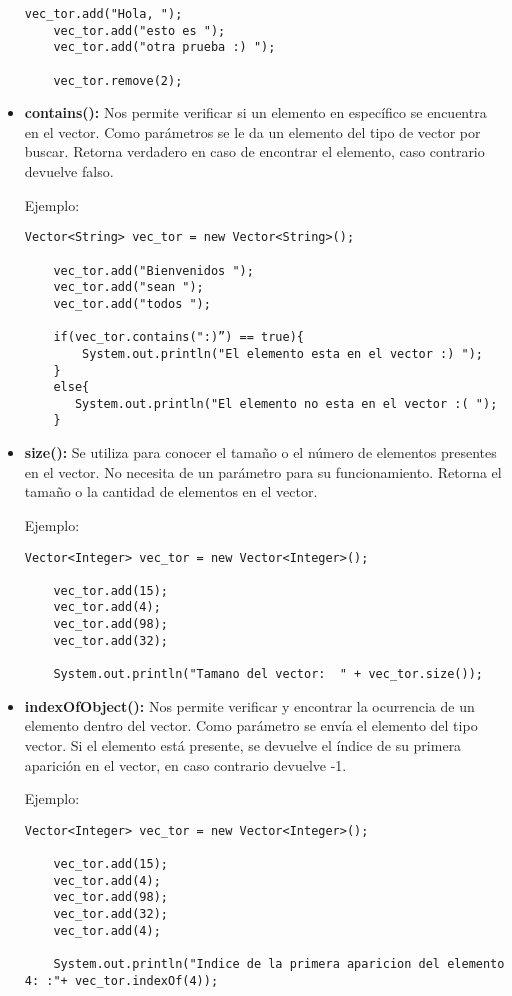 \documentclass[12pt, letterpaper]{article} %
\begin{document}
\begin{itemize}
\begin{lstlisting}[frame=single]
    vec_tor.add("Hola, ");
    vec_tor.add("esto es ");
    vec_tor.add("otra prueba :) ");

    vec_tor.remove(2);
    \end{lstlisting}

    \item \textbf{contains():} Nos permite verificar si un elemento en específico se encuentra en el vector. Como parámetros se le da un elemento del tipo de vector por buscar. Retorna verdadero en caso de encontrar el elemento, caso contrario devuelve falso.

    Ejemplo:
    \lstset{language = Java, breaklines=true, basicstyle=\footnotesize}
    \begin{lstlisting}[frame=single]
    Vector<String> vec_tor = new Vector<String>();

    vec_tor.add("Bienvenidos ");
    vec_tor.add("sean ");
    vec_tor.add("todos ");

    if(vec_tor.contains(":)”) == true){
        System.out.println("El elemento esta en el vector :) ");
    }
    else{
	   System.out.println("El elemento no esta en el vector :( ");
    }
    \end{lstlisting}

    \item \textbf{size():} Se utiliza para conocer el tamaño o el número de elementos presentes en el vector. No necesita de un parámetro para su funcionamiento. Retorna el tamaño o la cantidad de elementos en el vector.

    Ejemplo:
    \lstset{language = Java, breaklines=true, basicstyle=\footnotesize}
    \begin{lstlisting}[frame=single]
    Vector<Integer> vec_tor = new Vector<Integer>();

    vec_tor.add(15);
    vec_tor.add(4);
    vec_tor.add(98);
    vec_tor.add(32);

    System.out.println("Tamano del vector:  " + vec_tor.size());
    \end{lstlisting}
    
    \item \textbf{indexOfObject():} Nos permite verificar y encontrar la ocurrencia de un elemento dentro del vector. Como parámetro se envía el elemento del tipo vector. Si el elemento está presente, se devuelve el índice de su primera aparición en el vector, en caso contrario devuelve -1.
    
    Ejemplo:
    \lstset{language = Java, breaklines=true, basicstyle=\footnotesize}
    \begin{lstlisting}[frame=single]
    Vector<Integer> vec_tor = new Vector<Integer>();

    vec_tor.add(15);
    vec_tor.add(4);
    vec_tor.add(98);
    vec_tor.add(32);
    vec_tor.add(4);

    System.out.println("Indice de la primera aparicion del elemento 4: :"+ vec_tor.indexOf(4));
    \end{lstlisting}
\end{itemize}
\end{document}
